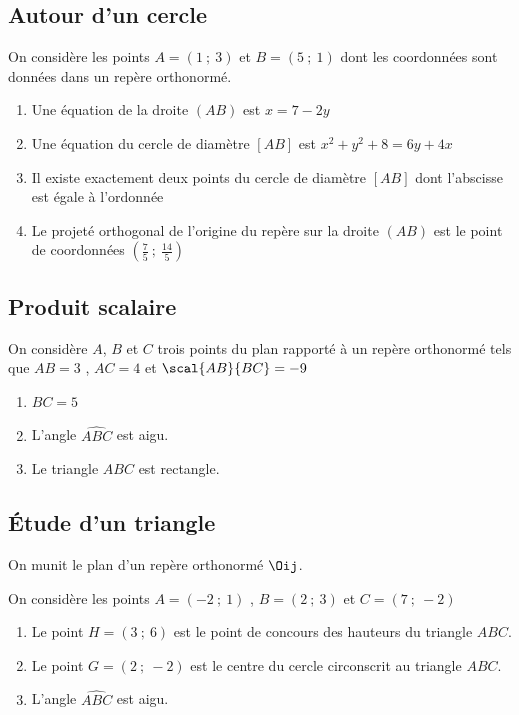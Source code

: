 \documentclass[oneside,12pt]{article}
\begin{document}
\subsection{Autour d'un cercle}
On considère les points $A=(1~;~3)$ et $B=(5~;~1)$ dont les coordonnées sont données dans un repère orthonormé.
\begin{enumerate}
    \item Une équation de la droite $(AB)$ est $x=7-2y$
    \item Une équation du cercle de diamètre $[AB]$ est $x^2+y^2+8=6y+4x$
    \item Il existe exactement deux points du cercle de diamètre $[AB]$ dont l'abscisse est égale à l'ordonnée
    \item Le projeté orthogonal de l'origine du repère sur la droite $(AB)$ est le point de coordonnées $\left(\frac{7}{5}~;~\frac{14}{5}\right)$
\end{enumerate}



\subsection{Produit scalaire}
On considère $A$, $B$ et $C$ trois points du plan rapporté à un repère orthonormé tels que $AB=3$ , $AC=4$ et $\scal{AB}{BC}=-9$
\begin{enumerate}
	\item $BC=5$
	\item L'angle $\widehat{ABC}$ est aigu.
	\item Le triangle $ABC$ est rectangle.
\end{enumerate}



\subsection{Étude d'un triangle}
On munit le plan d'un repère orthonormé $\Oij$.

On considère les points $A=(-2~;~1)$ , $B=(2~;~3)$ et $C=(7~;~-2)$
\begin{enumerate}
	\item Le point $H=(3~;~6)$ est le point de concours des hauteurs du triangle $ABC$.
	\item Le point $G=(2~;~-2)$ est le centre du cercle circonscrit au triangle $ABC$.
	\item L'angle $\widehat{ABC}$ est aigu.
\end{enumerate}
\end{document}
